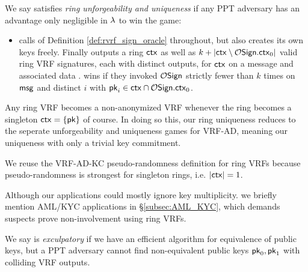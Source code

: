 \begin{definition}
We say \rVRF satisfies {\em ring unforgeability and uniqueness} if
any PPT adversary \adv has an advantage only
 negligible in $\lambda$ to win the game:
\begin{itemize}
\item[]
 \adv calls  of Definition \ref{def:rvrf_sign_oracle} throughout,
 but also creates its own keys freely.
 Finally \adv outputs a ring $\mathsf{ctx}$ as well as
 $k + |\mathsf{ctx} \setminus \mathcal{O}\mathsf{Sign}.\mathsf{ctx}_0|$ valid ring VRF signatures,
  each with distinct outputs,    %
 for $\mathsf{ctx}$ on a message \msg and associated data \aux.
 \adv wins if they invoked $\mathcal{O}\mathsf{Sign}$ strictly fewer than $k$ times on $\mathsf{msg}$  %
  and distinct $i$ with $\mathsf{pk}_i \in \mathsf{ctx} \cap \mathcal{O}\mathsf{Sign}.\mathsf{ctx}_0$.
\end{itemize}
\end{definition}
 
Any ring VRF becomes a non-anonymized VRF whenever
 the ring becomes a singleton $\mathsf{ctx} = \{ \mathsf{pk} \}$ of course.
In doing so this, our ring uniqueness reduces to
 the seperate unforgeability and uniqueness games for VRF-AD,
meaning our uniqueness with only a trivial key commitment.

We reuse the VRF-AD-KC pseudo-randomness definition for ring VRFs
because pseudo-randomness is strongest for singleton rings, i.e. $|\mathsf{ctx}| = 1$.

\smallskip 

Although our applications could mostly ignore key multiplicity. 
we briefly mention AML/KYC applications in \S\ref{subsec:AML_KYC},
which demands suspects prove non-involvement using ring VRFs.

\begin{definition}\label{def:rvrf_exculpability}
We say \rVRF is {\em exculpatory} if we have an efficient algorithm
for equivalence of public keys, but a PPT adversary \adv cannot
find non-equivalent public keys $\mathsf{pk}_0,\mathsf{pk}_1$ with colliding VRF outputs.
\end{definition} 



